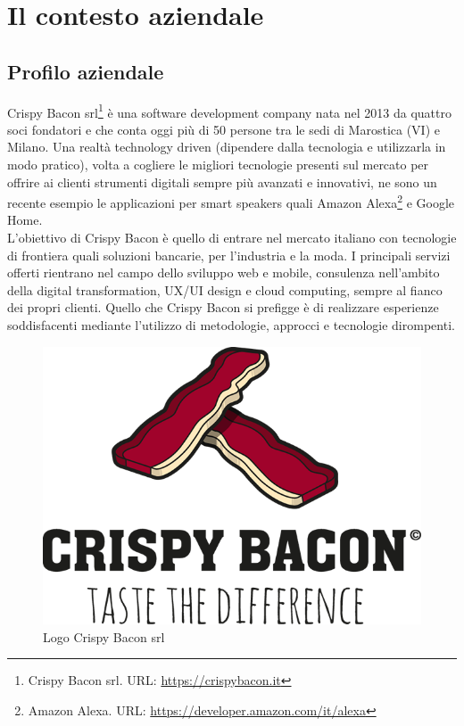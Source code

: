 
\chapter{Il contesto aziendale}
\label{cap:introduzione}
\section{Profilo aziendale}
Crispy Bacon srl\footnote{Crispy Bacon srl. URL: \href{https://crispybacon.it/}{https://crispybacon.it}} è una software development company nata nel 2013 da quattro soci fondatori e che conta oggi più di 50 persone tra le sedi di Marostica (VI) e Milano. Una realtà technology driven (dipendere dalla tecnologia e utilizzarla in modo pratico), volta a cogliere le migliori tecnologie presenti sul mercato per offrire ai clienti strumenti digitali sempre più avanzati e innovativi, ne sono un recente esempio le applicazioni per smart speakers quali Amazon Alexa\footnote{Amazon Alexa. URL: \href{https://developer.amazon.com/it/alexa}{https://developer.amazon.com/it/alexa}} e Google Home.\\
L’obiettivo di Crispy Bacon è quello di entrare nel mercato italiano con tecnologie di frontiera quali soluzioni bancarie, per l'industria e la moda.
I principali servizi offerti rientrano nel campo dello sviluppo web e mobile, consulenza nell'ambito della digital transformation, UX/UI design e cloud computing, sempre al fianco dei propri clienti.
Quello che Crispy Bacon si prefigge è di realizzare esperienze soddisfacenti mediante l’utilizzo di metodologie, approcci e tecnologie dirompenti.
\begin{figure}[H] 
    \centering 
    \includegraphics[width=0.7\columnwidth]{immagini/logo.png}
    \caption{\label{fig:logo_cripsy}Logo Crispy Bacon srl}
\end{figure}
